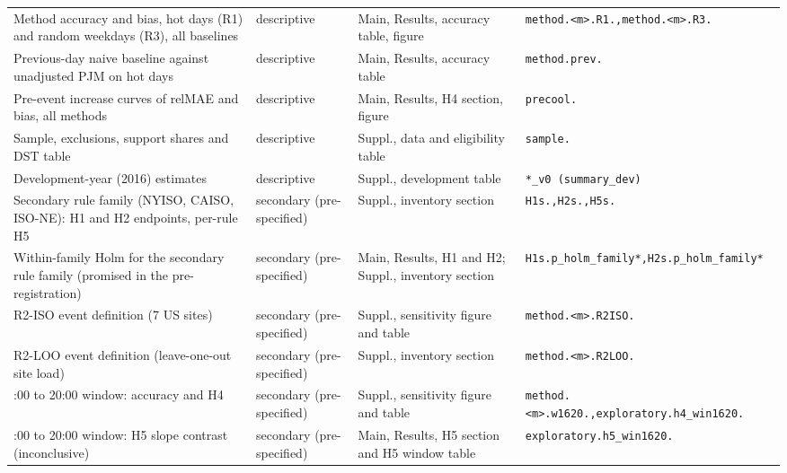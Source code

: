 {\begin{longtable}{@{}>{\raggedright\arraybackslash}p{}>{\raggedright\arraybackslash}p{}>{\raggedright\arraybackslash}p{}>{\raggedright\arraybackslash}p{}@{}}
Method accuracy and bias, hot days (R1) and random weekdays (R3), all baselines & descriptive & Main, Results, accuracy table, figure & \texttt{method.\allowbreak \textless{}m\textgreater{}.\allowbreak R1.\allowbreak {*},\allowbreak  method.\allowbreak \textless{}m\textgreater{}.\allowbreak R3.\allowbreak {*}} \\
Previous-day naive baseline against unadjusted PJM on hot days & descriptive & Main, Results, accuracy table & \texttt{method.\allowbreak prev.\allowbreak {*}} \\
Pre-event increase curves of relMAE and bias, all methods & descriptive & Main, Results, H4 section, figure & \texttt{precool.\allowbreak {*}} \\
Sample, exclusions, support shares and DST table & descriptive & Suppl., data and eligibility table & \texttt{sample.\allowbreak {*}} \\
Development-year (2016) estimates & descriptive & Suppl., development table & \texttt{{*}\_v0 (summary\_dev)} \\
Secondary rule family (NYISO, CAISO, ISO-NE): H1 and H2 endpoints, per-rule H5 & secondary (pre-specified) & Suppl., inventory section & \texttt{H1s.\allowbreak {*},\allowbreak  H2s.\allowbreak {*},\allowbreak  H5s.\allowbreak {*}} \\
Within-family Holm for the secondary rule family (promised in the pre-registration) & secondary (pre-specified) & Main, Results, H1 and H2; Suppl., inventory section & \texttt{H1s.\allowbreak p\_holm\_family{*},\allowbreak  H2s.\allowbreak p\_holm\_family{*}} \\
R2-ISO event definition (7 US sites) & secondary (pre-specified) & Suppl., sensitivity figure and table & \texttt{method.\allowbreak \textless{}m\textgreater{}.\allowbreak R2ISO.\allowbreak {*}} \\
R2-LOO event definition (leave-one-out site load) & secondary (pre-specified) & Suppl., inventory section & \texttt{method.\allowbreak \textless{}m\textgreater{}.\allowbreak R2LOO.\allowbreak {*}} \\
16:00 to 20:00 window: accuracy and H4 & secondary (pre-specified) & Suppl., sensitivity figure and table & \texttt{method.\allowbreak \textless{}m\textgreater{}.\allowbreak w1620.\allowbreak {*},\allowbreak  exploratory.\allowbreak h4\_win1620.\allowbreak {*}} \\
16:00 to 20:00 window: H5 slope contrast (inconclusive) & secondary (pre-specified) & Main, Results, H5 section and H5 window table & \texttt{exploratory.\allowbreak h5\_win1620.\allowbreak {*}} \\

\end{longtable}}

